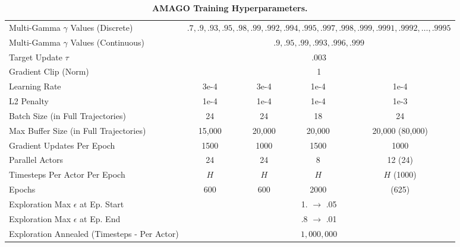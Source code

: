 \documentclass{article}
\begin{document}
\begin{table}[h]
{\begin{tabular}{@{}lcccc@{}}
Multi-Gamma $\gamma$ Values (Discrete)            & \multicolumn{4}{c}{$.7, .9, .93, .95, .98, .99, .992, .994, .995, .997, .998, .999, .9991, .9992, \dots, .9995$}                               \\
Multi-Gamma $\gamma$ Values (Continuous) & \multicolumn{4}{c}{$.9, .95, .99, .993, .996, .999$} \\
Target Update $\tau$                   & \multicolumn{4}{c}{.003}                                                                                                                                      \\
Gradient Clip (Norm) & \multicolumn{4}{c}{1} \\
Learning Rate                          & 3e-4                                         & 3e-4                                  & 1e-4                              & 1e-4                               \\
L2 Penalty                             & 1e-4                                         & 1e-4                                  & 1e-4                              & 1e-3                               \\
Batch Size (in Full Trajectories)      & 24                                           & 24                                    & 18                                & 24                                 \\
Max Buffer Size (in Full Trajectories) & 15,000                                       & 20,000                                & 20,000                            & 20,000 (80,000)                             \\
Gradient Updates Per Epoch             & 1500                                         & 1000                                  & 1500                              & 1000                               \\ \midrule
Parallel Actors                        & 24                                           & 24                                    & 8                                 & 12 (24)                                 \\
Timesteps Per Actor Per Epoch           & $H$ & $H$ & $H$ &  $H$ (1000) \\
Epochs                                 & 600                                          & 600                                   & 2000                              & (625)                               \\
Exploration Max $\epsilon$ at Ep. Start  & \multicolumn{4}{c}{1. $\rightarrow$ .05} \\
Exploration Max $\epsilon$ at Ep. End & \multicolumn{4}{c}{.8 $\rightarrow$ .01} \\
Exploration Annealed (Timesteps - Per Actor) & \multicolumn{4}{c}{$1,000,000$} \\ \bottomrule
\end{tabular}}
\caption{\textbf{AMAGO Training Hyperparameters.}}
\label{tbl:rl_hparams}
\end{table}
\end{document}
